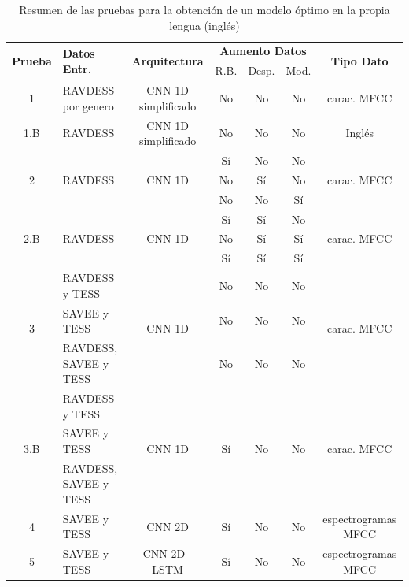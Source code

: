 \documentclass[11pt,a4paper,spanish]{book}
\begin{document}
	\begin{table}[H]
	\centering
	\begin{center}
		\begin{tabular}{| c | p{3.5cm} | c | c c c |c |}
			\hline
			\multirow{2}{*}{\textbf{Prueba}} &\multirow{2}{*}{\textbf{Datos Entr.}}& \multirow{2}{*}{\textbf{Arquitectura}} & 
			\multicolumn{3}{|c|}{\textbf{Aumento Datos}} & 
			\multirow{2}{*}{\textbf{Tipo Dato}} \\ \cline{4-6}
			& & & R.B. & Desp. & Mod. & \\ 
			\hline \hline
			
			1 & RAVDESS por genero & CNN 1D simplificado & No &No &No & carac. MFCC	\\ \hline
			1.B & RAVDESS & CNN 1D simplificado &No &No &No & Inglés	\\ \hline
			\multirow{3}{*}{2} & \multirow{3}{*}{RAVDESS} & \multirow{3}{*}{CNN 1D} &Sí &No &No  & \multirow{3}{*}{carac. MFCC}\\
			& & & No &Sí &No & 	\\
			& & & No &No &Sí  & 	\\ \hline
			
			\multirow{3}{*}{2.B} & \multirow{3}{*}{RAVDESS} & \multirow{3}{*}{CNN 1D } & Sí &Sí &No & \multirow{3}{*}{carac. MFCC}\\
			
			& &  & No &Sí &Sí & \\
			& &  & Sí &Sí &Sí& \\ \hline
			
			\multirow{3}{*}{3} & RAVDESS y TESS & \multirow{3}{*}{CNN 1D} &  No &No &No & \multirow{3}{*}{carac. MFCC}	\\ 
			\cline{2-2}
			& SAVEE y TESS &  &  No &No &No & 	\\
			\cline{2-2}
			& RAVDESS, SAVEE y TESS &  &  No &No &No & 	\\ \hline
			
			\multirow{3}{*}{3.B} & RAVDESS y TESS & \multirow{3}{*}{CNN 1D} & \multirow{3}{*}{ Sí}&\multirow{3}{*}{ No} & \multirow{3}{*}{ No} & \multirow{3}{*}{carac. MFCC}	\\
			& SAVEE y TESS &  & &&  & 	\\
			& RAVDESS, SAVEE y TESS &  & &&  & 	\\\hline
			
			4 & SAVEE y TESS & CNN 2D &Sí &No &No & espectrogramas MFCC\\ \hline
			5 & SAVEE y TESS & CNN 2D - LSTM &Sí &No &No & espectrogramas MFCC\\ \hline
			
		\end{tabular}
		
		\caption{Resumen de las pruebas para la obtención de un modelo óptimo en la propia lengua (inglés)}
		\label{}
	\end{center}
\end{table}
\end{document}
